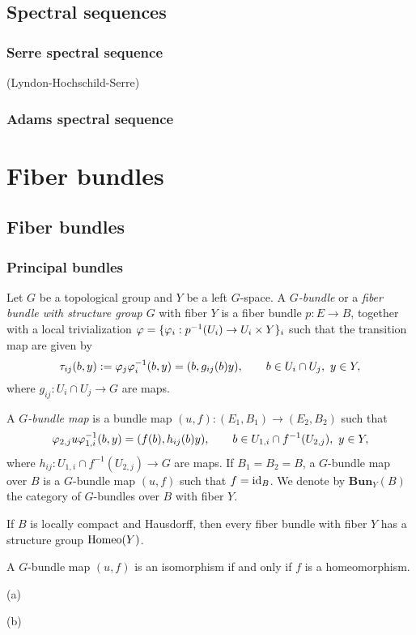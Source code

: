 \documentclass{../../large}
\begin{document}
\chapter{Spectral sequences}
\section{Serre spectral sequence}
	(Lyndon-Hochschild-Serre)
\section{Adams spectral sequence}











\part{Fiber bundles}




\chapter{Fiber bundles}


\section{Principal bundles}

\begin{prb}
Let $G$ be a topological group and $Y$ be a left $G$-space.
A \emph{$G$-bundle} or a \emph{fiber bundle with structure group $G$} with fiber $Y$ is a fiber bundle $p:E\to B$, together with a local trivialization $\varphi=\{\varphi_i:p^{-1}(U_i)\to U_i\times Y\}_i$ such that the transition map are given by
\[\tau_{ij}(b,y):=\varphi_j\varphi_i^{-1}(b,y)=(b,g_{ij}(b)y),
\qquad b\in U_i\cap U_j,\ y\in Y,\]
where $g_{ij}:U_i\cap U_j\to G$ are maps.

A \emph{$G$-bundle map} is a bundle map $(u,f):(E_1,B_1)\to(E_2,B_2)$ such that
\[\varphi_{2,j}u\varphi_{1,i}^{-1}(b,y)=(f(b),h_{ij}(b)y),
\qquad b\in U_{1,i}\cap f^{-1}(U_{2,j}),\ y\in Y,\]
where $h_{ij}:U_{1,i}\cap f^{-1}(U_{2,j})\to G$ are maps.
If $B_1=B_2=B$, a $G$-bundle map over $B$ is a $G$-bundle map $(u,f)$ such that $f=\operatorname{id}_B$.
We denote by $\mathbf{Bun}_Y(B)$ the category of $G$-bundles over $B$ with fiber $Y$.
\begin{parts}
\item If $B$ is locally compact and Hausdorff, then every fiber bundle with fiber $Y$ has a structure group $\operatorname{Homeo}(Y)$.
\item A $G$-bundle map $(u,f)$ is an isomorphism if and only if $f$ is a homeomorphism.
\end{parts}
\end{prb}
\begin{pf}
(a)

(b) 
\end{pf}
\end{document}
